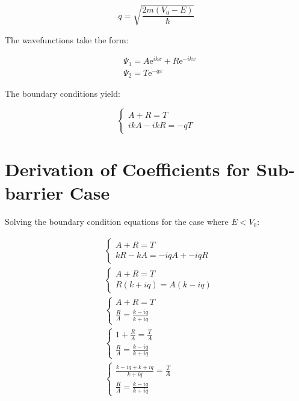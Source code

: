 \begin{equation}
q=\sqrt{\frac{2 m\left(V_{0}-E\right)}{\hbar}}
\end{equation}

The wavefunctions take the form:

\begin{align}
& \Psi_{1}=A \mathrm{e}^{i k x}+R \mathrm{e}^{-i k x} \\
& \Psi_{2}=T \mathrm{e}^{-q x}
\end{align}

The boundary conditions yield:

\[
\left\{\begin{array}{l}
A+R=T  \\
i k A-i k R=-q T
\end{array}\right.
\]


\section{Derivation of Coefficients for Sub-barrier Case}

Solving the boundary condition equations for the case where $E<V_0$:

\begin{align}
& \left\{\begin{array}{l}
A+R=T \\
k R-k A=-i q A+-i q R
\end{array}\right. \\
& \left\{\begin{array}{l}
A+R=T \\
R(k+i q)=A(k-i q)
\end{array}\right. \\
& \left\{\begin{array}{l}
A+R=T \\
\frac{R}{A}=\frac{k-i q}{k+i q}
\end{array}\right.  \\
& \left\{\begin{array}{l}
1+\frac{R}{A}=\frac{T}{A} \\
\frac{R}{A}=\frac{k-i q}{k+i q}
\end{array}\right. \\
& \left\{\begin{array}{l}
\frac{k-i q+k+i q}{k+i q}=\frac{T}{A} \\
\frac{R}{A}=\frac{k-i q}{k+i q}
\end{array}\right.
\end{align}

